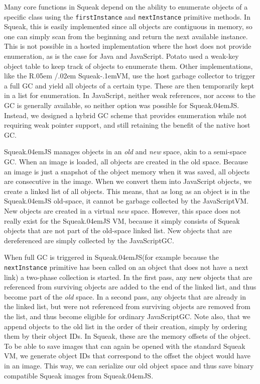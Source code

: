 \documentclass[natbib]{sigplanconf}
\newcommand*\SqueakJS{Squeak\texorpdfstring{\kern.04em}{}JS\xspace}
\newcommand*\JS{JavaScript\xspace}
\newcommand*\RSqueakVM{R\kern.05em /\kern.02em Squeak\kern-.1emVM\xspace}
\begin{document}
Many core functions in Squeak depend on the ability to enumerate
objects of a specific class using the \lstinline{firstInstance} and
\lstinline{nextInstance} primitive methods. In Squeak, this is easily
implemented since all objects are contiguous in memory, so one can
simply scan from the beginning and return the next available instance.
This is not possible in a hosted implementation where the host does
not provide enumeration, as is the case for Java and \JS. Potato used
a weak-key object table to keep track of objects to enumerate them.
Other implementations, like the \RSqueakVM, use the host
garbage collector to trigger a full \ac{GC} and yield all objects of
a certain type. These are then temporarily kept in a list for
enumeration. In \JS, neither weak references, nor access to the
\ac{GC} is generally available, so neither option was possible for
\SqueakJS. Instead, we designed a hybrid \ac{GC} scheme that provides
enumeration while not requiring weak pointer support, and still
retaining the benefit of the native host \ac{GC}.

\SqueakJS manages objects in an \emph{old} and \emph{new} space, akin
to a semi-space \ac{GC}. When an image is loaded, all objects are
created in the old space. Because an image is just a snapshot of the
object memory when it was saved, all objects are consecutive in the
image. When we convert them into \JS objects, we create a
linked list of all objects. This means, that as long as an object is
in the \SqueakJS old-space, it cannot be garbage collected by the
\JS \ac{VM}. New objects are created in a virtual \emph{new}
space. However, this space does not really exist for the \SqueakJS
\ac{VM}, because it simply consists of Squeak objects that are not
part of the old-space linked list. New objects that are dereferenced
are simply collected by the \JS \ac{GC}.

When full \ac{GC} is triggered in \SqueakJS (for example because the
\lstinline{nextInstance} primitive has been called on an object that
does not have a next link) a two-phase collection is started. In the
first pass, any new objects that are referenced from surviving objects
are added to the end of the linked list, and thus become part of the
\emph{old} space. In a second pass, any objects that are already in
the linked list, but were not referenced from surviving objects are
removed from the list, and thus become eligible for ordinary
\JS \ac{GC}. Note also, that we append objects to the old list
in the order of their creation, simply by ordering them by their
object \acp{ID}. In Squeak, these are the memory offsets of the object. To
be able to save images that can again be opened with the standard
Squeak \ac{VM}, we generate object \acp{ID} that correspond to the offset
the object would have in an image. This way, we can serialize our old
object space and thus save binary compatible Squeak images from
\SqueakJS.
\end{document}
